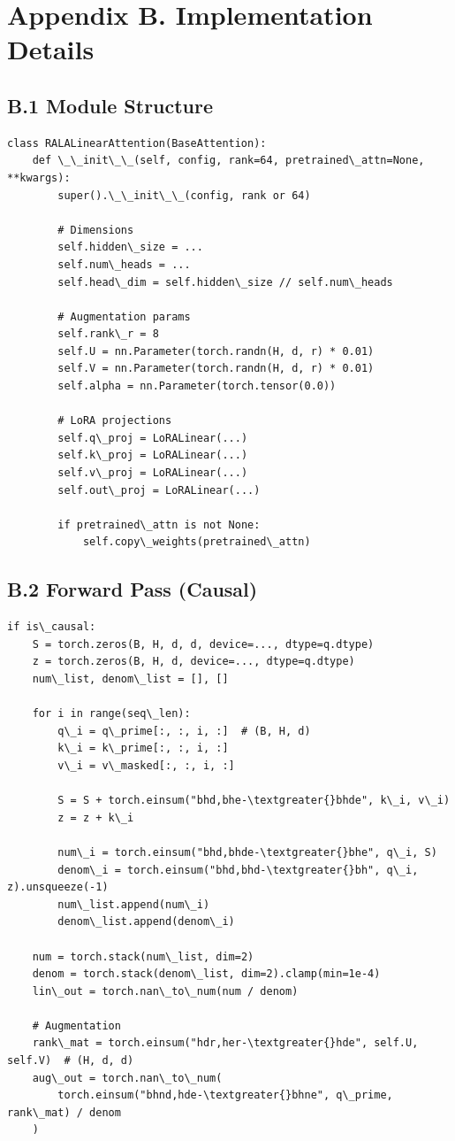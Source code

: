 
\section{Appendix B. Implementation Details}

\subsection{B.1 Module Structure}

\begin{lstlisting}
class RALALinearAttention(BaseAttention):
    def \_\_init\_\_(self, config, rank=64, pretrained\_attn=None, **kwargs):
        super().\_\_init\_\_(config, rank or 64)
        
        # Dimensions
        self.hidden\_size = ...
        self.num\_heads = ...
        self.head\_dim = self.hidden\_size // self.num\_heads
        
        # Augmentation params
        self.rank\_r = 8
        self.U = nn.Parameter(torch.randn(H, d, r) * 0.01)
        self.V = nn.Parameter(torch.randn(H, d, r) * 0.01)
        self.alpha = nn.Parameter(torch.tensor(0.0))
        
        # LoRA projections
        self.q\_proj = LoRALinear(...)
        self.k\_proj = LoRALinear(...)
        self.v\_proj = LoRALinear(...)
        self.out\_proj = LoRALinear(...)
        
        if pretrained\_attn is not None:
            self.copy\_weights(pretrained\_attn)
\end{lstlisting}

\subsection{B.2 Forward Pass (Causal)}

\begin{lstlisting}
if is\_causal:
    S = torch.zeros(B, H, d, d, device=..., dtype=q.dtype)
    z = torch.zeros(B, H, d, device=..., dtype=q.dtype)
    num\_list, denom\_list = [], []
    
    for i in range(seq\_len):
        q\_i = q\_prime[:, :, i, :]  # (B, H, d)
        k\_i = k\_prime[:, :, i, :]
        v\_i = v\_masked[:, :, i, :]
        
        S = S + torch.einsum("bhd,bhe-\textgreater{}bhde", k\_i, v\_i)
        z = z + k\_i
        
        num\_i = torch.einsum("bhd,bhde-\textgreater{}bhe", q\_i, S)
        denom\_i = torch.einsum("bhd,bhd-\textgreater{}bh", q\_i, z).unsqueeze(-1)
        num\_list.append(num\_i)
        denom\_list.append(denom\_i)
    
    num = torch.stack(num\_list, dim=2)
    denom = torch.stack(denom\_list, dim=2).clamp(min=1e-4)
    lin\_out = torch.nan\_to\_num(num / denom)
    
    # Augmentation
    rank\_mat = torch.einsum("hdr,her-\textgreater{}hde", self.U, self.V)  # (H, d, d)
    aug\_out = torch.nan\_to\_num(
        torch.einsum("bhnd,hde-\textgreater{}bhne", q\_prime, rank\_mat) / denom
    )
\end{lstlisting}


